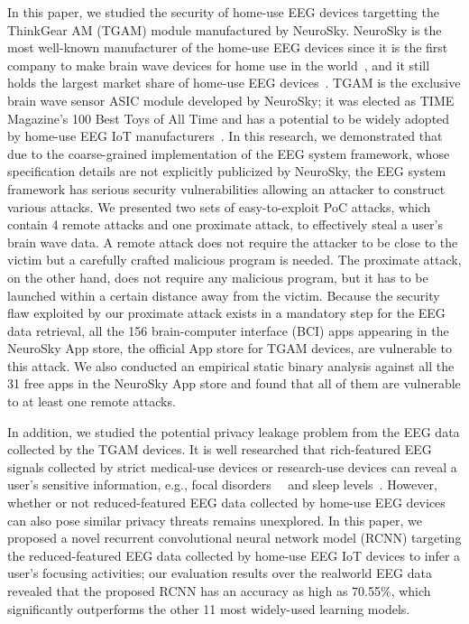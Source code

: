 \indent In this paper, we studied the security of home-use EEG devices targetting the ThinkGear AM (TGAM) module manufactured by NeuroSky. NeuroSky is the most well-known manufacturer of the home-use EEG devices since it is the first company to make brain wave devices for home use in the world~\cite{firsthomeeeg}, and it still holds the largest market share of home-use EEG devices~\cite{neuroskymarket}. TGAM is the exclusive brain wave sensor ASIC module developed by NeuroSky; it was elected as TIME Magazine's 100 Best Toys of All Time and has a potential to be widely adopted by home-use EEG IoT manufacturers~\cite{tgammarket}. In this research,  we demonstrated that due to the coarse-grained implementation of the EEG system framework, whose specification details are not explicitly publicized by NeuroSky, the EEG system framework has serious security vulnerabilities allowing an attacker to construct various attacks. We presented two sets of easy-to-exploit PoC attacks, which contain 4 remote attacks and one proximate attack, to effectively steal a user's brain wave data. A remote attack does not require the attacker to be close to the victim but a carefully crafted malicious program is needed. The proximate attack, on the other hand, does not require any malicious program, but it has to be launched within a certain distance away from the victim. %
Because the security flaw exploited by our proximate attack exists in a mandatory step for the EEG data retrieval, all the 156 brain-computer interface (BCI) apps appearing in the NeuroSky App store, the official App store for TGAM devices, are vulnerable to this attack. We also conducted an empirical static binary analysis against all the 31 free apps in the NeuroSky App store and found that all of them are vulnerable to at least one remote attacks. %

\indent In addition, we studied the potential privacy leakage problem from the EEG data collected by the TGAM devices. It is well researched that rich-featured EEG signals collected by strict medical-use devices or research-use devices can reveal a user's sensitive information, e.g., focal disorders~\cite{eegdiagnosis}~\cite{dauwels2010diagnosis} and sleep levels~\cite{nakamura2017automatic}. However, whether or not reduced-featured EEG data collected by home-use EEG devices can also pose similar privacy threats remains unexplored. In this paper, we proposed a novel recurrent convolutional neural network model (RCNN) targeting the reduced-featured EEG data collected by home-use EEG IoT devices to infer a user's focusing activities; our evaluation results over the realworld EEG data revealed that the proposed RCNN has an accuracy as high as 70.55\%, which significantly outperforms the other 11 most widely-used learning models.

